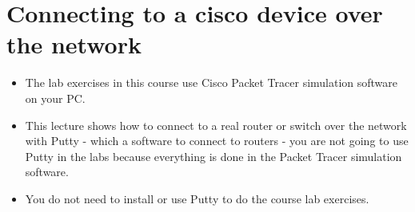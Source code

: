 \section{Connecting to a cisco device over the network}
\begin{itemize}
    \item The lab exercises in this course use Cisco Packet Tracer simulation software on your PC.
    \item This lecture shows how to connect to a real router or switch over the network with Putty - which a software to connect to routers - you are not going to use Putty in the labs because everything is done in the Packet Tracer simulation software.
    \item You do not need to install or use Putty to do the course lab exercises.
\end{itemize}

